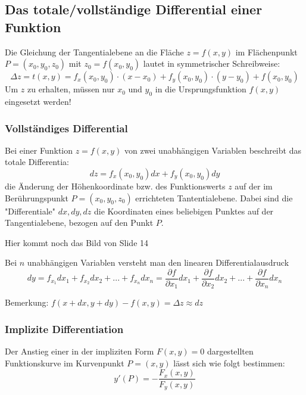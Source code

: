 \subsection{Das totale/vollständige Differential einer Funktion}
\begin{definition}
Die Gleichung der Tangentialebene an die Fläche $z = f(x, y)$ im Flächenpunkt $P=(x_0, y_0, z_0)$ mit $z_0 = f(x_0, y_0)$ lautet in symmetrischer Schreibweise:
$$\Delta z = t(x, y) = f_x(x_0, y_0) \cdot (x-x_0) + f_y(x_0, y_0) \cdot (y - y_0) + f(x_0, y_0)$$
Um $z$ zu erhalten, müssen nur $x_0$ und $y_0$ in die Ursprungsfunktion $f(x,y)$ eingesetzt werden!

\end{definition}

\subsubsection{Vollständiges Differential}
\begin{definition}
Bei einer Funktion  $z=f(x,y)$ von zwei unabhängigen Variablen beschreibt das totale Differentia:
$$ dz = f_x(x_0, y_0) dx + f_y(x_0, y_0) dy$$
die Änderung der Höhenkoordinate bzw. des Funktionswerts $z$ auf der im Berührungspunkt $P = (x_0, y_0, z_0)$ errichteten Tantentialebene. Dabei sind die "Differentiale"  $ dx, dy, dz$ die Koordinaten eines beliebigen Punktes auf der Tangentialebene, bezogen auf den Punkt $P$.

Hier kommt noch das Bild von Slide 14

Bei $n$ unabhängigen Variablen versteht man den linearen Differentialausdruck
$$dy = f_{x_1} dx_1 + f_{x_2} dx_2 + ... + f_{x_n} dx_n = \frac{\partial f}{\partial x_1} dx_1 + \frac{\partial f}{\partial x_2} dx_2 + ... + \frac{\partial f}{\partial x_n} dx_n$$

Bemerkung: $f(x+dx, y+dy) - f(x,y) = \Delta z \approx dz$
\end{definition}

\subsubsection{Implizite Differentiation}
\begin{definition}
Der Anstieg einer in der impliziten Form $F(x, y) = 0$ dargestellten Funktionskurve im Kurvenpunkt $P=(x,y)$ lässt sich wie folgt bestimmen:
$$y'(P) = - \frac{F_x(x,y)}{F_y(x,y)}$$
\end{definition}

